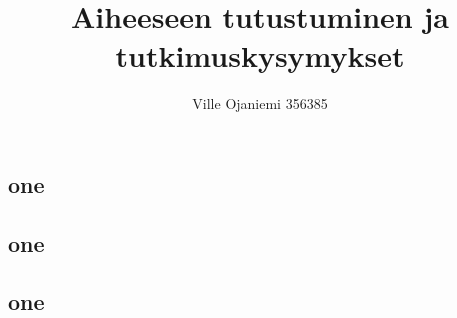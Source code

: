\documentclass[11pt]{article}
\title{Aiheeseen tutustuminen ja tutkimuskysymykset}
\author{Ville Ojaniemi 356385}
\begin{document}
\maketitle
\subsection{one}
\subsection{one}
\subsection{one}
\end{document}
